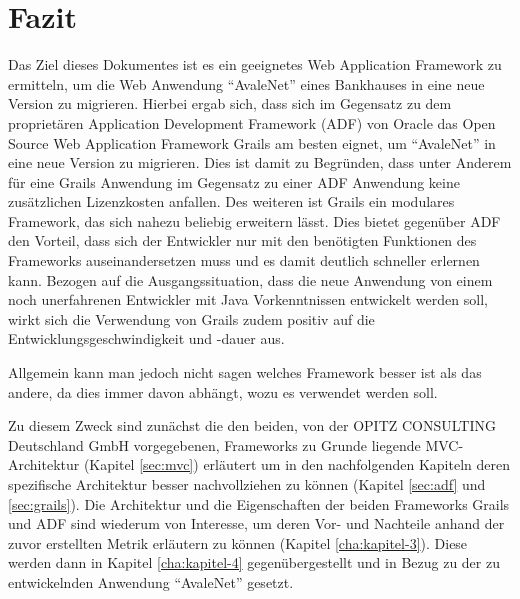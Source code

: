 \section{Fazit}
\label{cha:fazit}
Das Ziel dieses Dokumentes ist es ein geeignetes Web Application Framework zu ermitteln, um die Web Anwendung "`AvaleNet"' eines Bankhauses in eine neue Version zu migrieren. Hierbei ergab sich, dass sich im Gegensatz zu dem proprietären Application Development Framework (ADF) von Oracle das Open Source Web Application Framework Grails am besten eignet, um "`AvaleNet"' in eine neue Version zu migrieren. Dies ist damit zu Begründen, dass unter Anderem für eine Grails Anwendung im Gegensatz zu einer ADF Anwendung keine zusätzlichen Lizenzkosten anfallen. Des weiteren ist Grails ein modulares Framework, das sich nahezu beliebig erweitern lässt. Dies bietet gegenüber ADF den Vorteil, dass sich der Entwickler nur mit den benötigten Funktionen des Frameworks auseinandersetzen muss und es damit deutlich schneller erlernen kann.
Bezogen auf die Ausgangssituation, dass die neue Anwendung von einem noch unerfahrenen Entwickler mit Java Vorkenntnissen entwickelt werden soll, wirkt sich die Verwendung von Grails zudem positiv auf die Entwicklungsgeschwindigkeit und -dauer aus.

Allgemein kann man jedoch nicht sagen welches Framework besser ist als das andere, da dies immer davon abhängt, wozu es verwendet werden soll.


Zu diesem Zweck sind zunächst die den beiden, von der OPITZ CONSULTING Deutschland GmbH vorgegebenen, Frameworks zu Grunde liegende MVC-Architektur (Kapitel \ref{sec:mvc}) erläutert um in den nachfolgenden Kapiteln deren spezifische Architektur besser nachvollziehen zu können (Kapitel \ref{sec:adf} und \ref{sec:grails}). Die Architektur und die Eigenschaften der beiden Frameworks Grails und ADF sind wiederum von Interesse, um deren Vor- und Nachteile anhand der zuvor erstellten Metrik erläutern zu können (Kapitel \ref{cha:kapitel-3}). Diese werden dann in Kapitel \ref{cha:kapitel-4} gegenübergestellt und in Bezug zu der zu entwickelnden Anwendung "`AvaleNet"' gesetzt.